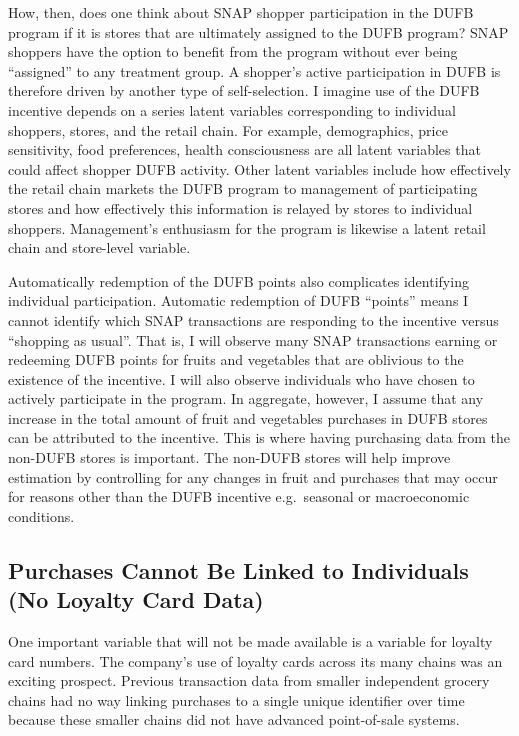 \documentclass[12pt,letterpaperpaper,]{book}
\begin{document}
How, then, does one think about SNAP shopper participation in the DUFB
program if it is stores that are ultimately assigned to the DUFB
program? SNAP shoppers have the option to benefit from the program
without ever being ``assigned'' to any treatment group. A shopper's
active participation in DUFB is therefore driven by another type of
self-selection. I imagine use of the DUFB incentive depends on a series
latent variables corresponding to individual shoppers, stores, and the
retail chain. For example, demographics, price sensitivity, food
preferences, health consciousness are all latent variables that could
affect shopper DUFB activity. Other latent variables include how
effectively the retail chain markets the DUFB program to management of
participating stores and how effectively this information is relayed by
stores to individual shoppers. Management's enthusiasm for the program
is likewise a latent retail chain and store-level variable.

Automatically redemption of the DUFB points also complicates identifying
individual participation. Automatic redemption of DUFB ``points'' means
I cannot identify which SNAP transactions are responding to the
incentive versus ``shopping as usual''. That is, I will observe many
SNAP transactions earning or redeeming DUFB points for fruits and
vegetables that are oblivious to the existence of the incentive. I will
also observe individuals who have chosen to actively participate in the
program. In aggregate, however, I assume that any increase in the total
amount of fruit and vegetables purchases in DUFB stores can be
attributed to the incentive. This is where having purchasing data from
the non-DUFB stores is important. The non-DUFB stores will help improve
estimation by controlling for any changes in fruit and purchases that
may occur for reasons other than the DUFB incentive e.g.~seasonal or
macroeconomic conditions.

\subsection*{Purchases Cannot Be Linked to Individuals (No Loyalty Card
Data)}\label{purchases-cannot-be-linked-to-individuals-no-loyalty-card-data}

One important variable that will not be made available is a variable for
loyalty card numbers. The company's use of loyalty cards across its many
chains was an exciting prospect. Previous transaction data from smaller
independent grocery chains had no way linking purchases to a single
unique identifier over time because these smaller chains did not have
advanced point-of-sale systems.
\end{document}
